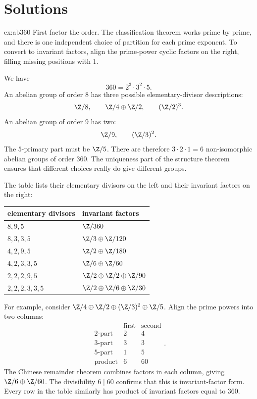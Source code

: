 \section{Solutions}

\begin{solution}{ex:ab360}
\idea First factor the order. The classification theorem works prime by prime, and there is one independent choice of partition for each prime exponent. To convert to invariant factors, align the prime-power cyclic factors on the right, filling missing positions with $1$.

\writeup We have
\[
360=2^3\cdot3^2\cdot5.
\]
An abelian group of order $8$ has three possible elementary-divisor descriptions:
\[
\Z/8,\qquad\Z/4\oplus\Z/2,\qquad(\Z/2)^3.
\]
An abelian group of order $9$ has two:
\[
\Z/9,\qquad(\Z/3)^2.
\]
The $5$-primary part must be $\Z/5$. There are therefore $3\cdot2\cdot1=6$ non-isomorphic abelian groups of order $360$. The uniqueness part of the structure theorem ensures that different choices really do give different groups.

The table lists their elementary divisors on the left and their invariant factors on the right:
\begin{center}
\small
\begin{tabular}{ll}
elementary divisors & invariant factors\\\hline
$8,9,5$ & $\Z/360$\\
$8,3,3,5$ & $\Z/3\oplus\Z/120$\\
$4,2,9,5$ & $\Z/2\oplus\Z/180$\\
$4,2,3,3,5$ & $\Z/6\oplus\Z/60$\\
$2,2,2,9,5$ & $\Z/2\oplus\Z/2\oplus\Z/90$\\
$2,2,2,3,3,5$ & $\Z/2\oplus\Z/6\oplus\Z/30$
\end{tabular}
\end{center}
For example, consider $\Z/4\oplus\Z/2\oplus(\Z/3)^2\oplus\Z/5$. Align the prime powers into two columns:
\[
\begin{array}{c|cc}
&\text{first}&\text{second}\\\hline
2\text{-part}&2&4\\
3\text{-part}&3&3\\
5\text{-part}&1&5\\\hline
\text{product}&6&60
\end{array}.
\]
The Chinese remainder theorem combines factors in each column, giving $\Z/6\oplus\Z/60$. The divisibility $6\mid60$ confirms that this is invariant-factor form. Every row in the table similarly has product of invariant factors equal to $360$.
\end{solution}

